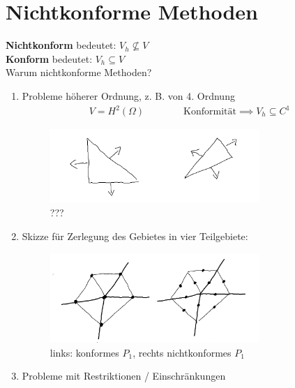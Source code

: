 \section{Nichtkonforme Methoden}
\textbf{Nichtkonform} bedeutet: $V_h\not\subseteq V$\\
\textbf{Konform} bedeutet: $V_h\subseteq V$\\
Warum nichtkonforme Methoden?
\begin{enumerate}[label=(\roman*)]
\item Probleme höherer Ordnung, z. B. von 4. Ordnung
\begin{align*}
V=H^2(\Omega)\qquad\qquad%
\text{Konformität}\implies V_h\subseteq C^1
\end{align*}
\begin{figure}[!ht]
	\begin{center}
		\includegraphics[width=0.75\textwidth]{pics/Sketch4.png}
		\caption{???}
		\label{Abb???}
	\end{center}
\end{figure}
\item Skizze für Zerlegung des Gebietes in vier Teilgebiete:
\begin{figure}[!ht]
	\begin{center}
		\includegraphics[width=0.75\textwidth]{pics/Sketch5.png}
		\caption{links: konformes $P_1$, rechts nichtkonformes $P_1$}
		\label{AbbNonconformingMethods}
	\end{center}
\end{figure}
\item Probleme mit Restriktionen / Einschränkungen
\end{enumerate}

